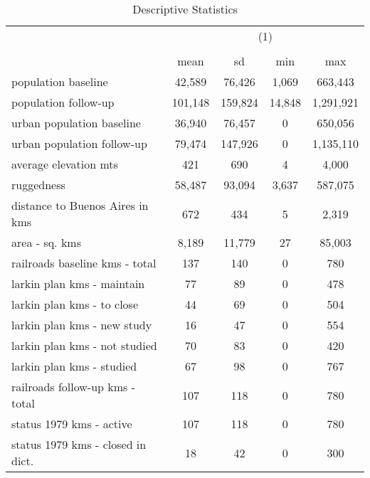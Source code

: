 \begin{table}[htbp]\centering
\def\sym#1{\ifmmode^{#1}\else\(^{#1}\)\fi}
\caption{Descriptive Statistics}
\begin{tabular}{l*{1}{cccc}}
\hline\hline
                    &\multicolumn{4}{c}{(1)}                            \\
                    &\multicolumn{4}{c}{}                               \\
                    &        mean&          sd&         min&         max\\
\hline
population baseline &      42,589&      76,426&       1,069&     663,443\\
population follow-up&     101,148&     159,824&      14,848&   1,291,921\\
urban population baseline&      36,940&      76,457&           0&     650,056\\
urban population follow-up&      79,474&     147,926&           0&   1,135,110\\
average elevation mts&         421&         690&           4&       4,000\\
ruggedness          &      58,487&      93,094&       3,637&     587,075\\
distance to Buenos Aires in kms&         672&         434&           5&       2,319\\
area - sq. kms      &       8,189&      11,779&          27&      85,003\\
railroads baseline kms - total&         137&         140&           0&         780\\
larkin plan kms - maintain&          77&          89&           0&         478\\
larkin plan kms - to close&          44&          69&           0&         504\\
larkin plan kms - new study&          16&          47&           0&         554\\
larkin plan kms - not studied&          70&          83&           0&         420\\
larkin plan kms - studied&          67&          98&           0&         767\\
railroads follow-up kms - total&         107&         118&           0&         780\\
status 1979 kms - active&         107&         118&           0&         780\\
status 1979 kms - closed in dict.&          18&          42&           0&         300\\

\end{tabular}
\end{table}
